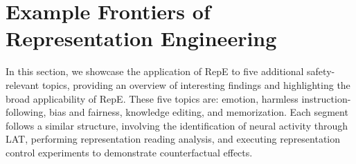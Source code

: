 \section{Example Frontiers of Representation Engineering}\label{sec:example_frontiers_of_repe}

In this section, we showcase the application of RepE to five additional safety-relevant topics, providing an overview of interesting findings and highlighting the broad applicability of RepE. These five topics are: emotion, harmless instruction-following, bias and fairness, knowledge editing, and memorization. Each segment follows a similar structure, involving the identification of neural activity through LAT, performing representation reading analysis, and executing representation control experiments to demonstrate counterfactual effects.





